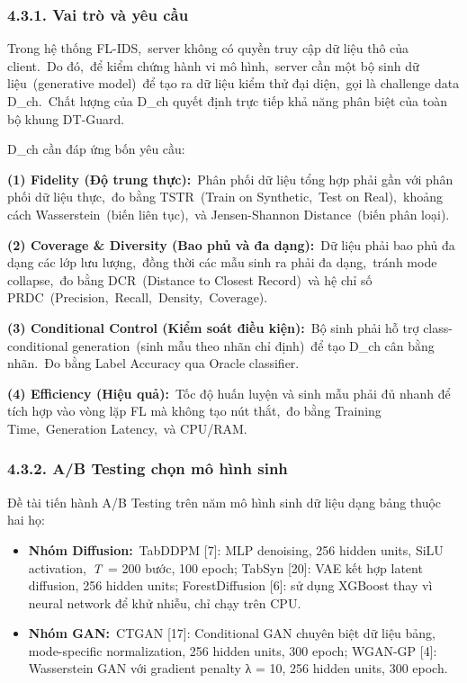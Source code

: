 \subsubsection{4.3.1. Vai trò và yêu cầu}\label{vai-truxf2-vuxe0-yuxeau-cux1ea7u}

Trong hệ thống FL-IDS,~server không có quyền truy cập dữ liệu thô của client.~Do đó,~để kiểm chứng hành vi mô hình,~server cần một bộ sinh dữ liệu~(generative model)~để tạo ra dữ liệu kiểm thử đại diện,~gọi là challenge data D\_ch.~Chất lượng của D\_ch quyết định trực tiếp khả năng phân biệt của toàn bộ khung DT-Guard.

D\_ch cần đáp ứng bốn yêu cầu:

\textbf{(1) Fidelity (Độ trung thực):}~Phân phối dữ liệu tổng hợp phải gần với phân phối dữ liệu thực,~đo bằng TSTR~(Train on Synthetic,~Test on Real),~khoảng cách Wasserstein~(biến liên tục),~và Jensen-Shannon Distance~(biến phân loại).

\textbf{(2) Coverage \& Diversity (Bao phủ và đa dạng):}~Dữ liệu phải bao phủ đa dạng các lớp lưu lượng,~đồng thời các mẫu sinh ra phải đa dạng,~tránh mode collapse,~đo bằng DCR~(Distance to Closest Record)~và hệ chỉ số PRDC~(Precision,~Recall,~Density,~Coverage).

\textbf{(3) Conditional Control (Kiểm soát điều kiện):}~Bộ sinh phải hỗ trợ class-conditional generation~(sinh mẫu theo nhãn chỉ định)~để tạo D\_ch cân bằng nhãn.~Đo bằng Label Accuracy qua Oracle classifier.

\textbf{(4) Efficiency (Hiệu quả):}~Tốc độ huấn luyện và sinh mẫu phải đủ nhanh để tích hợp vào vòng lặp FL mà không tạo nút thắt,~đo bằng Training Time,~Generation Latency,~và CPU/RAM.

\subsubsection{4.3.2. A/B Testing chọn mô hình sinh}\label{ab-testing-chux1ecdn-muxf4-huxecnh-sinh}

Đề tài tiến hành A/B Testing trên năm mô hình sinh dữ liệu dạng bảng thuộc hai họ:

\begin{itemize}
\item
  \textbf{Nhóm Diffusion:}~TabDDPM {[}7{]}: MLP denoising, 256 hidden units, SiLU activation,~\emph{T}~= 200 bước, 100 epoch; TabSyn {[}20{]}: VAE kết hợp latent diffusion, 256 hidden units; ForestDiffusion {[}6{]}: sử dụng XGBoost thay vì neural network để khử nhiễu, chỉ chạy trên CPU.
\item
  \textbf{Nhóm GAN:}~CTGAN {[}17{]}: Conditional GAN chuyên biệt dữ liệu bảng, mode-specific normalization, 256 hidden units, 300 epoch; WGAN-GP {[}4{]}: Wasserstein GAN với gradient penalty λ = 10, 256 hidden units, 300 epoch.
\end{itemize}

